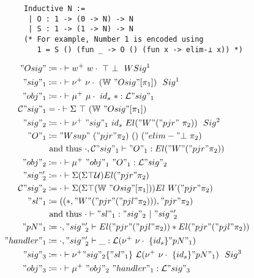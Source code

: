 \begin{figure}
  \begin{minipage}{\linewidth}
    \begin{verbatim}
      Inductive N :=
       | O : 1 -> (0 -> N) -> N 
       | S : 1 -> (1 -> N) -> N
      (* For example, Number 1 is encoded using
         1 = S () (fun _ -> O () (fun x -> elim-⊥ x)) *)
    \end{verbatim}
  \end{minipage}

  \begin{minipage}[t]{0.4\linewidth}
  \small
\begin{align*}
  "Osig" &\coloneqq \goodWSig{\cdot}{w^+\ w\cdot\ \top\ \bot}{1} \\
  "sig"_1 &\coloneqq \goodSig{\cdot}{\nu^+ \ \nu\cdot  \ (\bW \ "Osig"[\pi_1])}{1}  \\
  "obj"_1 &\coloneqq \goodTerm{\cdot}{\mu^+ \ \mu\cdot \ {id_s} \ *}{\cL"sig"_1}\\
  \cC"sig"_1 &= \goodType{\cdot}{\Sigma \ \top \ (\bW \ "Osig"[\pi_1]) }{} \\
  "sig"_2 &\coloneqq  \goodSig{\cdot}{\nu^+ \ "sig"_1 \ {id_s} \ El ("W" ("pjr" \ \pi_2))}{2} \\ 
  "O"_1 &\coloneqq {"Wsup" \ ("pjr" \pi_2) \ () \ ("elim-"\bot \ \pi_2)}  \\ 
  & \text{ and thus }  \goodTerm{\cdot, \cC"sig"_1}{"O"_1}{El ("W" ("pjr" \pi_2))} \\
  "obj"_2 &\coloneqq \goodTerm{\cdot}{\mu^+ \ "obj"_1 \ "O"_1}{\cL"sig"_2} \\
  "sig"_2' &\coloneqq \goodType{\cdot}{\Sigma (\Sigma \top \cU)El ("pjr" \pi_2)}{} \\ 
  \cC"sig"_2 &\coloneqq \goodType{\cdot}{\Sigma (\Sigma \top (\bW \ "Osig"[\pi_1]))El \ W("pjr" \pi_2) }{} \\ 
  "sl"_1 &\coloneqq ((*, "W" ("pjr" ("pjl" \pi_2)) ), "pjr" \pi_2) \\ 
  & \text{ and thus }  \goodSeal{\cdot}{"sl"_1}{"sig"_2}{"sig"_2'} \\
  "pN"_1 &\coloneqq \goodType{\cdot, "sig"_2'}{El ("pjr" ("pjl" \pi_2)) * El ("pjr" ("pjl" \pi_2))}{} \\
  "handler"_1 &\coloneqq \goodTerm{\cdot, "sig"_2'}{\_}{\cL(\nu^+ \ \nu\cdot \ \{id_s\} "pN"_1)} \\
  "sig"_3 &\coloneqq \goodSig{\cdot}{\nu^+ "sig"_2 \{"sl"_1\} \ \cL(\nu^+ \ \nu\cdot \ \{id_s\} "pN"_1)}{3} \\ 
  "obj"_3 &\coloneqq \goodTerm{\cdot}{\mu^+~"obj"_2~"handler"_1}{\cL"sig"_3}\\

\end{align*}
\end{minipage}
\end{figure}
